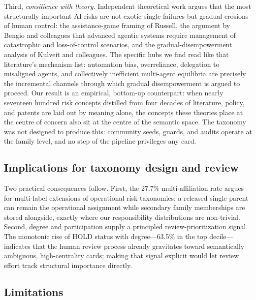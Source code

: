 \documentclass[fleqn,10pt]{wlscirep}
\begin{document}
Third, \emph{consilience with theory}. Independent theoretical work argues
that the most structurally important AI risks are not exotic single failures
but gradual erosions of human control: the assistance-game framing of
Russell\cite{russell2019}, the argument by Bengio and colleagues that
advanced agentic systems require management of catastrophic and
loss-of-control scenarios\cite{bengio2024}, and the gradual-disempowerment
analysis of Kulveit and colleagues\cite{kulveit2025}. The specific hubs we
find read like that literature's mechanism list: automation bias,
overreliance, delegation to misaligned agents, and collectively inefficient
multi-agent equilibria are precisely the incremental channels through which
gradual disempowerment is argued to proceed. Our result is an empirical,
bottom-up counterpart: when nearly seventeen hundred risk concepts
distilled from four decades of literature, policy, and patents are laid out
by meaning alone, the concepts these theories place at the centre of
concern also sit at the centre of the semantic space. The taxonomy was not
designed to produce this: community seeds, guards, and audits operate at
the family level, and no step of the pipeline privileges any card.

\subsection*{Implications for taxonomy design and review}

Two practical consequences follow. First, the 27.7\% multi-affiliation rate
argues for multi-label extensions of operational risk taxonomies: a released
single parent can remain the operational assignment while secondary family
memberships are stored alongside, exactly where our responsibility
distributions are non-trivial. Second, degree and participation supply a
principled review-prioritization signal. The monotonic rise of HOLD status
with degree---63.5\% in the top decile---indicates that the human review
process already gravitates toward semantically ambiguous, high-centrality
cards; making that signal explicit would let review effort track structural
importance directly.

\subsection*{Limitations}
\end{document}
